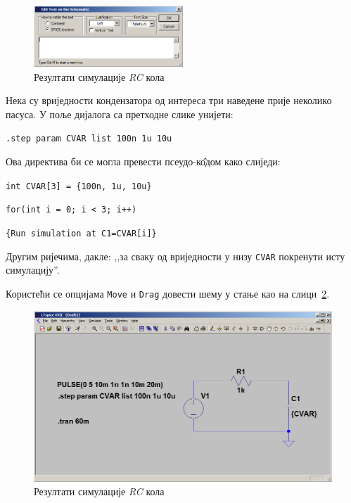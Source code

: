 \begin{figure}[h]
\centering
\includegraphics[width=0.5\textwidth]{figs/rc-step2.PNG}
\caption{Резултати симулације \textit{RC} кола}
\label{Fig:rc-step2}
\end{figure}

Нека су вриједности кондензатора од интереса три наведене прије неколико пасуса. У поље дијалога са претходне слике унијети:

\begin{center}
\texttt{.step param CVAR list 100n 1u 10u}
\end{center}

Ова директива би се могла превести псеудо-к\^{о}дом како слиједи:

\vspace{6pt}
\noindent\texttt{int CVAR[3] = \{100n, 1u, 10u\}}

\noindent\texttt{for(int i = 0; i < 3; i++)}

\hspace{48pt}\texttt{\{Run simulation at C1=CVAR[i]\}}
\vspace{6pt}

Другим ријечима, дакле: ,,за сваку од вриједности у низу \texttt{CVAR} покренути исту симулацију''.

Користећи се опцијама \texttt{Move} и \texttt{Drag} довести шему у стање као на слици~\ref{Fig:rc-step3}.

\begin{figure}[h]
\centering
\includegraphics[width=\figwidth\textwidth]{figs/rc-step3.PNG}
\caption{Резултати симулације \textit{RC} кола}
\label{Fig:rc-step3}
\end{figure}

